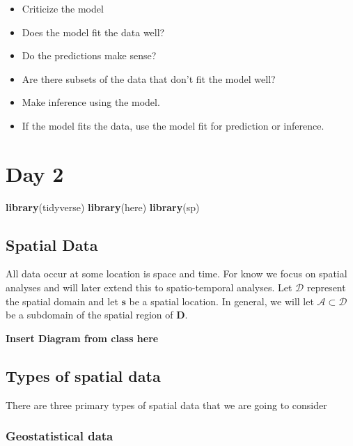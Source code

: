 \documentclass[]{book}
\newenvironment{Shaded}{\begin{snugshade}}{\end{snugshade}}
\newcommand{\KeywordTok}[1]{\textcolor[rgb]{0.13,0.29,0.53}{\textbf{#1}}}
\newcommand{\NormalTok}[1]{#1}
\begin{document}
\begin{itemize}
\item
  Criticize the model
\item
  Does the model fit the data well?
\item
  Do the predictions make sense?
\item
  Are there subsets of the data that don't fit the model well?
\item
  Make inference using the model.
\item
  If the model fits the data, use the model fit for prediction or inference.
\end{itemize}

\hypertarget{day-2}{%
\chapter{Day 2}\label{day-2}}

\begin{Shaded}
\begin{Highlighting}[]
\KeywordTok{library}\NormalTok{(tidyverse)}
\KeywordTok{library}\NormalTok{(here)}
\KeywordTok{library}\NormalTok{(sp)}
\end{Highlighting}
\end{Shaded}

\hypertarget{spatial-data}{%
\section{Spatial Data}\label{spatial-data}}

All data occur at some location is space and time. For know we focus on spatial analyses and will later extend this to spatio-temporal analyses. Let \(\mathcal{D}\) represent the spatial domain and let \(\mathbf{s}\) be a spatial location. In general, we will let \(\mathcal{A} \subset \mathcal{D}\) be a subdomain of the spatial region of \(\mathbf{D}\).

\textbf{Insert Diagram from class here}

\hypertarget{types-of-spatial-data}{%
\section{Types of spatial data}\label{types-of-spatial-data}}

There are three primary types of spatial data that we are going to consider

\hypertarget{geostatistical-data}{%
\subsection{Geostatistical data}\label{geostatistical-data}}
\end{document}
